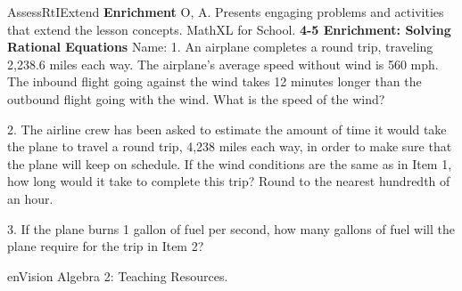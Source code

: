 \documentclass{article}
\newenvironment{te-addendum}[2]{}{}     %
\newcommand{\answer}[1]{}               %
\newcommand{\te}[1]{}                   %
\begin{document}
\begin{te-addendum}{Assess}{RtIExtend}
\textbf{Enrichment} O, A. Presents engaging problems and activities that extend the lesson concepts. MathXL for School.
\textbf{4-5 Enrichment: Solving Rational Equations}
Name: \underline{\hspace{3cm}}
1. An airplane completes a round trip, traveling 2,238.6 miles each way. The airplane's average speed without wind is 560 mph. The inbound flight going against the wind takes 12 minutes longer than the outbound flight going with the wind. What is the speed of the wind?
\answer{(\frac{2238.6}{560+c}+\frac{1}{5}=\frac{2238.6}{560-c})
(5(1253616-2238.6c)+313600-c^2=5(1253616+2238.6c))
(6268080-11193c+313600-c^2=6268080+11193c)
(c^2-22386c+313600=0)
((c-14)(c+22400)=0)
(c-14=0\text{ or }c+22400=0)
(c=14\text{ or }c=-22400)
The wind is blowing at 14 mph.}
\te{Printed (c^2-22386c+313600=0); likely (-c^2-22386c+313600=0), or its negation, is intended. The printed factorization and final rate agree with the earlier equation.}
2. The airline crew has been asked to estimate the amount of time it would take the plane to travel a round trip, 4,238 miles each way, in order to make sure that the plane will keep on schedule. If the wind conditions are the same as in Item 1, how long would it take to complete this trip? Round to the nearest hundredth of an hour.
\answer{Solve for the total time (t) in hours it will take to travel 4,238 miles.
(t=\frac{4238}{574}+\frac{4238}{546})
(=\frac{4238(546)}{574(546)}+\frac{4238(574)}{546(574)})
(=\frac{2313948}{313404}+\frac{2432612}{313404})
(=\frac{4746560}{313404})
(\approx15.15\text{ hours})}
3. If the plane burns 1 gallon of fuel per second, how many gallons of fuel will the plane require for the trip in Item 2?
\answer{Since there are 3,600 seconds in one hour, (15.15\times3,600=54,540) gallons.}
enVision Algebra 2: Teaching Resources.
\end{te-addendum}
\end{document}
